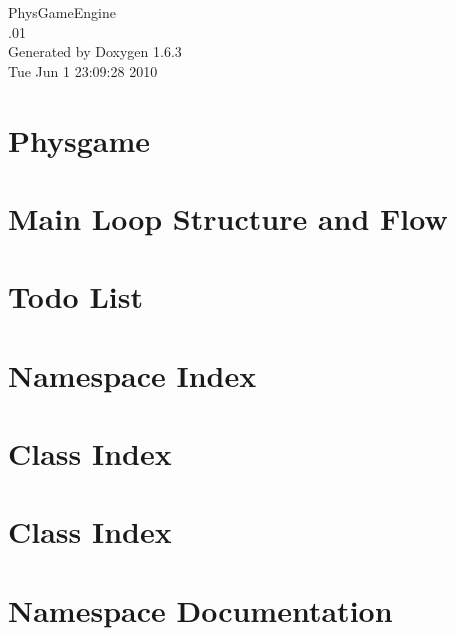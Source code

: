 \documentclass[a4paper]{book}
\begin{document}
\hypersetup{pageanchor=false}
\begin{titlepage}
\vspace*{7cm}
\begin{center}
{\Large PhysGameEngine \\[1ex]\large .01 }\\
\vspace*{1cm}
{\large Generated by Doxygen 1.6.3}\\
\vspace*{0.5cm}
{\small Tue Jun 1 23:09:28 2010}\\
\end{center}
\end{titlepage}
\clearemptydoublepage
{}
\tableofcontents
\clearemptydoublepage
{}
\hypersetup{pageanchor=true}
\chapter{Physgame}
\label{index}\hypertarget{index}{}
\chapter{Main Loop Structure and Flow}
\label{mainloop1}
\hypertarget{mainloop1}{}

\chapter{Todo List}
\label{todo}
\hypertarget{todo}{}

\chapter{Namespace Index}

\chapter{Class Index}

\chapter{Class Index}

\chapter{Namespace Documentation}




\end{document}
